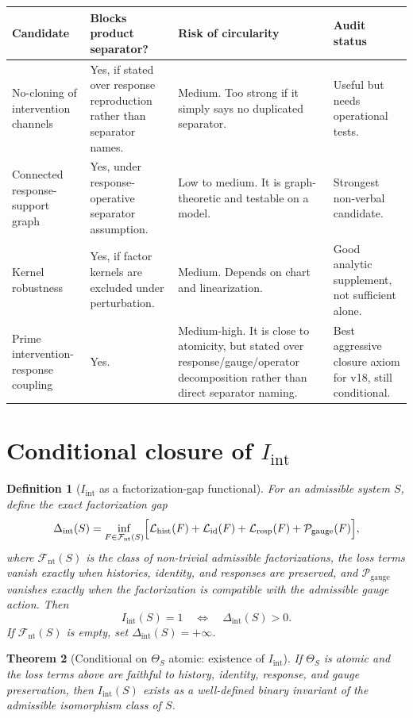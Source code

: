\documentclass[11pt]{article}
\newtheorem{definition}{Definition}[section]
\newtheorem{theorem}[definition]{Theorem}
\newcommand{\Iint}{I_{\mathrm{int}}}
\begin{document}
\begin{longtable}{p{}p{}p{}p{}}
\toprule
Candidate & Blocks product separator? & Risk of circularity & Audit status \\
\midrule
No-cloning of intervention channels & Yes, if stated over response reproduction rather than separator names. & Medium. Too strong if it simply says no duplicated separator. & Useful but needs operational tests. \\
Connected response-support graph & Yes, under response-operative separator assumption. & Low to medium. It is graph-theoretic and testable on a model. & Strongest non-verbal candidate. \\
Kernel robustness & Yes, if factor kernels are excluded under perturbation. & Medium. Depends on chart and linearization. & Good analytic supplement, not sufficient alone. \\
Prime intervention-response coupling & Yes. & Medium-high. It is close to atomicity, but stated over response/gauge/operator decomposition rather than direct separator naming. & Best aggressive closure axiom for v18, still conditional. \\
\bottomrule
\end{longtable}

\section{Conditional closure of $I_{\mathrm{int}}$}

\begin{definition}[$I_{\mathrm{int}}$ as a factorization-gap functional]
For an admissible system $S$, define the exact factorization gap
\[
  \Delta_{\mathrm{int}}(S)=\inf_{F\in\mathcal F_{\mathrm{nt}}(S)}
  \Bigl[\mathcal L_{\mathrm{hist}}(F)+\mathcal L_{\mathrm{id}}(F)+\mathcal L_{\mathrm{resp}}(F)+\mathcal P_{\mathrm{gauge}}(F)\Bigr],
\]
where $\mathcal F_{\mathrm{nt}}(S)$ is the class of non-trivial admissible factorizations, the loss terms vanish exactly when histories, identity, and responses are preserved, and $\mathcal P_{\mathrm{gauge}}$ vanishes exactly when the factorization is compatible with the admissible gauge action. Then
\[
  \Iint(S)=1 \quad\Longleftrightarrow\quad \Delta_{\mathrm{int}}(S)>0.
\]
If $\mathcal F_{\mathrm{nt}}(S)$ is empty, set $\Delta_{\mathrm{int}}(S)=+\infty$.
\end{definition}

\begin{theorem}[Conditional on $\Theta_S$ atomic: existence of $I_{\mathrm{int}}$]
If $\Theta_S$ is atomic and the loss terms above are faithful to history, identity, response, and gauge preservation, then $\Iint(S)$ exists as a well-defined binary invariant of the admissible isomorphism class of $S$.
\end{theorem}
\end{document}
